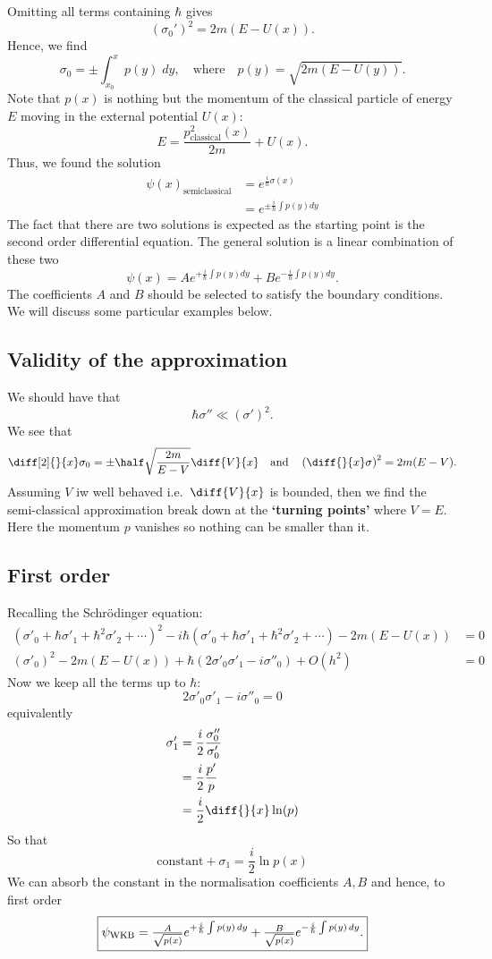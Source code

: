 \documentclass[12pt, a4paper]{article}
\begin{document}
Omitting all terms containing \(\hbar\) gives
\[\left(\sigma_0'\right)^2 = 2m(E - U(x)).\]
Hence, we find
\[\sigma_0 = \pm \int_{x_0}^x p(y)\; dy, \quad \text{where} \quad p(y) = \sqrt{2m(E - U(y))}.\]
Note that \(p(x)\) is nothing but the momentum of the classical particle of energy \(E\) moving in the external potential \(U(x)\):
\[E = \frac{p^2_{\text{classical}}(x)}{2m} + U(x).\]
Thus, we found the solution
\[\begin{aligned}
    \psi(x)_{\text{semiclassical}} &= e^{\frac{i}{\hbar} \sigma(x)} \\
    &=e^{\pm \frac{i}{\hbar} \int p(y)dy}
\end{aligned}\]
The fact that there are two solutions is expected as the starting point is the second order differential equation. The general solution is a linear combination of these two
\[\psi(x) = Ae^{+\frac{i}{\hbar} \int p(y)dy} + Be^{-\frac{i}{\hbar} \int p(y)dy}.\]
The coefficients \(A\) and \(B\) should be selected to satisfy the boundary conditions. We will discuss some particular examples below.

\subsection{Validity of the approximation}

We should have that 
\[\hbar \sigma'' \ll (\sigma')^2.\]
We see that 
\[\diff[2]{}{x}\sigma_0 = \pm \half \sqrt{\frac{2m}{E-V}}\diff{V}{x} \quad \text{and} \quad \left( \diff{}{x}\sigma \right)^2=2m(E-V).\]
Assuming \(V\) iw well behaved i.e.\ \(\diff{V}{x}\) is bounded, then we find the semi-classical approximation break down at the \textbf{`turning points'} where \(V=E\). Here the momentum \(p\) vanishes  so nothing can be smaller than it.

\subsection{First order}

Recalling the Schrödinger equation:
\[\begin{aligned}
    (\sigma'_0 + \hbar\sigma'_1+ \hbar^2 \sigma'_2 +\cdots)^2-i\hbar\left( \sigma'_0 + \hbar\sigma'_1+ \hbar^2 \sigma'_2 +\cdots \right)-2m(E-U(x)) &=0 \\
    (\sigma'_0)^2-2m(E-U(x))+\hbar(2\sigma'_0\sigma'_1-i\sigma''_0)+O(h^2)&=0
\end{aligned}\]
Now we keep all the terms up to \(\hbar\):
\[2\sigma'_0\sigma'_1-i\sigma''_0=0\]
equivalently
\[\begin{aligned}
    \sigma'_1 &= \frac{i}{2} \frac{\sigma''_0}{\sigma'_0} \\
    &=\frac{i}{2} \frac{p'}{p} \\
    &= \frac{i}{2} \diff{}{x} \ln(p)
\end{aligned}\]
So that
\[\text{constant} +\sigma_1 =\frac{i}{2} \ln p(x)\]
We can absorb the constant in the normalisation coefficients \(A,B\) and hence, to first order 
\[
\fbox{\(
\psi_{\text{WKB}} = \frac{A}{\sqrt{p(x)}}e^{+\frac{i}{\hbar} \int p(y)\, dy}+\frac{B}{\sqrt{p(x)}}e^{-\frac{i}{\hbar} \int p(y)\,dy}.
\)}
\]
\end{document}
